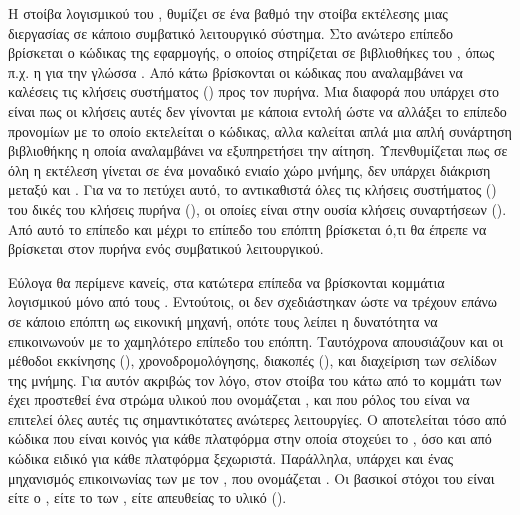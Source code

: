 Η στοίβα λογισμικού του , θυμίζει σε ένα βαθμό την στοίβα
εκτέλεσης μιας διεργασίας σε κάποιο συμβατικό λειτουργικό
σύστημα. Στο ανώτερο επίπεδο βρίσκεται ο κώδικας της εφαρμογής,
ο οποίος στηρίζεται σε βιβλιοθήκες του , όπως π.χ. η 
για την γλώσσα . Από κάτω βρίσκονται οι κώδικας που αναλαμβάνει
να καλέσεις τις κλήσεις συστήματος () προς τον
πυρήνα. Μια διαφορά που υπάρχει στο  είναι πως οι κλήσεις
αυτές δεν γίνονται με
κάποια  εντολή ώστε να αλλάξει το επίπεδο προνομίων με το
οποίο εκτελείται ο κώδικας, αλλα καλείται απλά μια απλή συνάρτηση
βιβλιοθήκης η οποία αναλαμβάνει να εξυπηρετήσει την αίτηση.
Υπενθυμίζεται πως σε  όλη η εκτέλεση γίνεται σε ένα
μοναδικό ενιαίο χώρο μνήμης, δεν υπάρχει διάκριση μεταξύ
 και . Για να το πετύχει αυτό, το
 αντικαθιστά όλες τις κλήσεις συστήματος ()
του  δικές του κλήσεις πυρήνα (), οι
οποίες είναι στην ουσία κλήσεις συναρτήσεων ().
Από αυτό το επίπεδο και μέχρι το επίπεδο του επόπτη βρίσκεται
ό,τι θα έπρεπε να βρίσκεται στον πυρήνα ενός συμβατικού λειτουργικού.
\newline

Εύλογα θα περίμενε κανείς, στα κατώτερα επίπεδα να βρίσκονται
κομμάτια λογισμικού μόνο από τους . Εντούτοις,
οι  δεν σχεδιάστηκαν ώστε να τρέχουν επάνω σε κάποιο
επόπτη ως εικονική μηχανή, οπότε τους λείπει η δυνατότητα να
επικοινωνούν με το χαμηλότερο επίπεδο του επόπτη. Ταυτόχρονα
απουσιάζουν και οι μέθοδοι εκκίνησης (), χρονοδρομολόγησης,
διακοπές (), και διαχείριση των σελίδων της μνήμης.
Για αυτόν ακριβώς τον λόγο, στον στοίβα του  κάτω
από το κομμάτι των  έχει προστεθεί ένα στρώμα
υλικού που ονομάζεται , και που
ρόλος του είναι να επιτελεί όλες αυτές τις σημαντικότατες
ανώτερες λειτουργίες.
Ο  αποτελείται τόσο από κώδικα
που είναι κοινός για κάθε πλατφόρμα στην οποία στοχεύει το
, όσο και από κώδικα ειδικό για κάθε πλατφόρμα
ξεχωριστά\cite{Orestis}. Παράλληλα, υπάρχει και ένας μηχανισμός
επικοινωνίας των  με τον , που ονομάζεται
\cite{noOSnoProb}. Οι βασικοί στόχοι του  είναι είτε ο ,
είτε το  των , είτε απευθείας το υλικό ().
\newline


